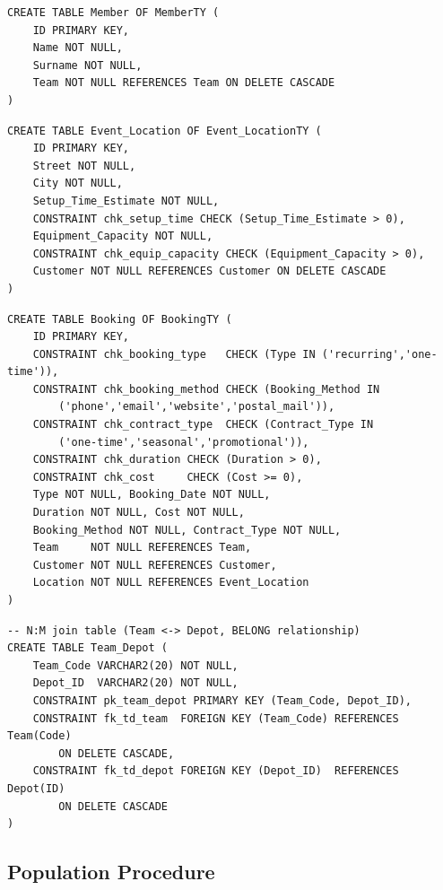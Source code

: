 \begin{lstlisting}
CREATE TABLE Member OF MemberTY (
    ID PRIMARY KEY,
    Name NOT NULL,
    Surname NOT NULL,
    Team NOT NULL REFERENCES Team ON DELETE CASCADE
)
\end{lstlisting}

\begin{lstlisting}
CREATE TABLE Event_Location OF Event_LocationTY (
    ID PRIMARY KEY,
    Street NOT NULL,
    City NOT NULL,
    Setup_Time_Estimate NOT NULL,
    CONSTRAINT chk_setup_time CHECK (Setup_Time_Estimate > 0),
    Equipment_Capacity NOT NULL,
    CONSTRAINT chk_equip_capacity CHECK (Equipment_Capacity > 0),
    Customer NOT NULL REFERENCES Customer ON DELETE CASCADE
)
\end{lstlisting}

\begin{lstlisting}
CREATE TABLE Booking OF BookingTY (
    ID PRIMARY KEY,
    CONSTRAINT chk_booking_type   CHECK (Type IN ('recurring','one-time')),
    CONSTRAINT chk_booking_method CHECK (Booking_Method IN
        ('phone','email','website','postal_mail')),
    CONSTRAINT chk_contract_type  CHECK (Contract_Type IN
        ('one-time','seasonal','promotional')),
    CONSTRAINT chk_duration CHECK (Duration > 0),
    CONSTRAINT chk_cost     CHECK (Cost >= 0),
    Type NOT NULL, Booking_Date NOT NULL,
    Duration NOT NULL, Cost NOT NULL,
    Booking_Method NOT NULL, Contract_Type NOT NULL,
    Team     NOT NULL REFERENCES Team,
    Customer NOT NULL REFERENCES Customer,
    Location NOT NULL REFERENCES Event_Location
)
\end{lstlisting}

\begin{lstlisting}
-- N:M join table (Team <-> Depot, BELONG relationship)
CREATE TABLE Team_Depot (
    Team_Code VARCHAR2(20) NOT NULL,
    Depot_ID  VARCHAR2(20) NOT NULL,
    CONSTRAINT pk_team_depot PRIMARY KEY (Team_Code, Depot_ID),
    CONSTRAINT fk_td_team  FOREIGN KEY (Team_Code) REFERENCES Team(Code)
        ON DELETE CASCADE,
    CONSTRAINT fk_td_depot FOREIGN KEY (Depot_ID)  REFERENCES Depot(ID)
        ON DELETE CASCADE
)
\end{lstlisting}

\subsection{Population Procedure}

